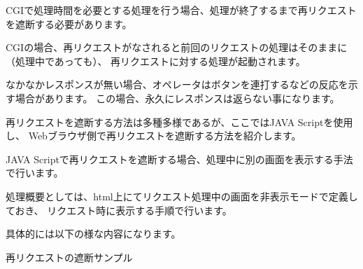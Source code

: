 
CGIで処理時間を必要とする処理を行う場合、処理が終了するまで再リクエストを遮断する必要があります。

CGIの場合、再リクエストがなされると前回のリクエストの処理はそのままに（処理中であっても）、
再リクエストに対する処理が起動されます。

なかなかレスポンスが無い場合、オペレータはボタンを連打するなどの反応を示す場合があります。
この場合、永久にレスポンスは返らない事になります。

再リクエストを遮断する方法は多種多様であるが、ここではJAVA Scriptを使用し、
Webブラウザ側で再リクエストを遮断する方法を紹介します。

JAVA Scriptで再リクエストを遮断する場合、処理中に別の画面を表示する手法で行います。

処理概要としては、html上にてリクエスト処理中の画面を非表示モードで定義しておき、
リクエスト時に表示する手順で行います。

具体的には以下の様な内容になります。

\vspace{1em}

{\gt 再リクエストの遮断サンプル}

